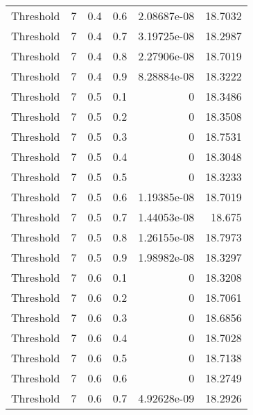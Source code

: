 \documentclass{article}
\begin{document}
\begin{longtable}[H]{lrrrrr}
 Threshold      &       7 &   0.4 &            0.6 &      2.08687e-08 &         18.7032 \\
 Threshold      &       7 &   0.4 &            0.7 &      3.19725e-08 &         18.2987 \\
 Threshold      &       7 &   0.4 &            0.8 &      2.27906e-08 &         18.7019 \\
 Threshold      &       7 &   0.4 &            0.9 &      8.28884e-08 &         18.3222 \\
 Threshold      &       7 &   0.5 &            0.1 &      0           &         18.3486 \\
 Threshold      &       7 &   0.5 &            0.2 &      0           &         18.3508 \\
 Threshold      &       7 &   0.5 &            0.3 &      0           &         18.7531 \\
 Threshold      &       7 &   0.5 &            0.4 &      0           &         18.3048 \\
 Threshold      &       7 &   0.5 &            0.5 &      0           &         18.3233 \\
 Threshold      &       7 &   0.5 &            0.6 &      1.19385e-08 &         18.7019 \\
 Threshold      &       7 &   0.5 &            0.7 &      1.44053e-08 &         18.675  \\
 Threshold      &       7 &   0.5 &            0.8 &      1.26155e-08 &         18.7973 \\
 Threshold      &       7 &   0.5 &            0.9 &      1.98982e-08 &         18.3297 \\
 Threshold      &       7 &   0.6 &            0.1 &      0           &         18.3208 \\
 Threshold      &       7 &   0.6 &            0.2 &      0           &         18.7061 \\
 Threshold      &       7 &   0.6 &            0.3 &      0           &         18.6856 \\
 Threshold      &       7 &   0.6 &            0.4 &      0           &         18.7028 \\
 Threshold      &       7 &   0.6 &            0.5 &      0           &         18.7138 \\
 Threshold      &       7 &   0.6 &            0.6 &      0           &         18.2749 \\
 Threshold      &       7 &   0.6 &            0.7 &      4.92628e-09 &         18.2926 \\

\end{longtable}
\end{document}
